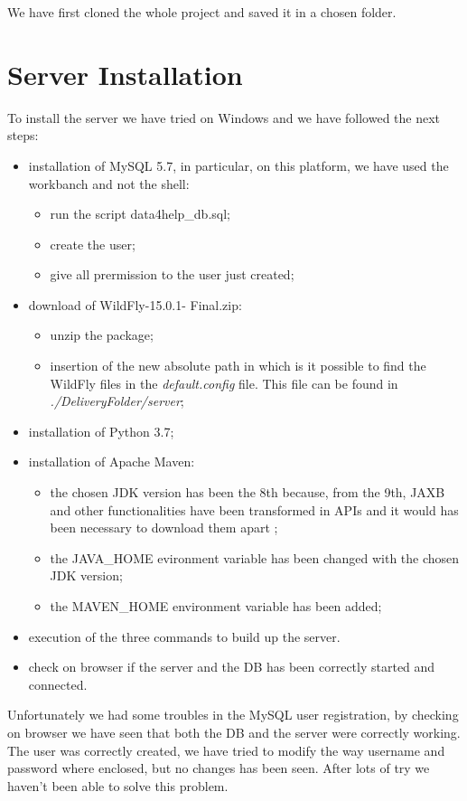 We have first cloned the whole project and saved it in a chosen folder.
\section{Server Installation}
To install the server we have tried on Windows and we have followed the next steps:
\begin{itemize}
	\item installation of MySQL 5.7, in particular, on this platform, we have used the workbanch and not the shell:
		\begin{itemize}
			\item run the script data4help\_db.sql;
			\item create the user;
			\item give all prermission to the user just created;
		\end{itemize}
	\item download of WildFly-15.0.1- Final.zip:
		\begin{itemize}
			\item unzip the package;
			\item insertion of the new absolute path in which is it possible to find the WildFly files in the \textit{default.config} 				file. This file can be found in \textit{./DeliveryFolder/server};
		\end{itemize}
	\item installation of Python 3.7;
	\item installation of Apache Maven:
		\begin{itemize}
			\item the chosen JDK version has been the 8th because, from the 9th, JAXB and other functionalities have been 					transformed in APIs and it would has been necessary to download them apart ;
			\item the JAVA\_HOME evironment variable has been changed with the chosen JDK version;
			\item the MAVEN\_HOME environment variable has been added;
		\end{itemize}
	\item execution of the three commands to build up the server.
	\item check on browser if the server and the DB has been correctly started and connected.
\end{itemize}Unfortunately we had some troubles in the MySQL user registration, by checking on browser we have seen that both the DB and the server were correctly working. The user was correctly created, we have tried to modify the way username and password where enclosed, but no changes has been seen. After lots of try we haven't been able to solve this problem.\\
